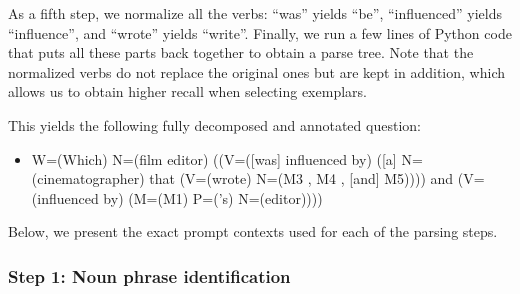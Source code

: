 \documentclass{article} \usepackage{iclr2022_conference,times}
\newcommand{\example}[1]{\begin{itemize} #1 \end{itemize}}
\newcommand{\ex}{\item}
\begin{document}
As a fifth step, we normalize all the verbs: ``was'' yields ``be'', ``influenced'' yields ``influence'', and ``wrote'' yields ``write''. Finally, we run a few lines of Python code that puts all these parts back together to obtain a parse tree. Note that the normalized verbs do not replace the original ones but are kept in addition, which allows us to obtain higher recall when selecting exemplars.

This yields the following fully decomposed and annotated question: 

\example{\ex W=(Which) N=(film editor) ((V=([was] influenced by) ([a] N=(cinematographer) that (V=(wrote) N=(M3 , M4 , [and] M5)))) and (V=(influenced by) (M=(M1) P=('s) N=(editor))))}

Below, we present the exact prompt contexts used for each of the parsing steps.

\subsubsection{Step 1: Noun phrase identification}
\end{document}
